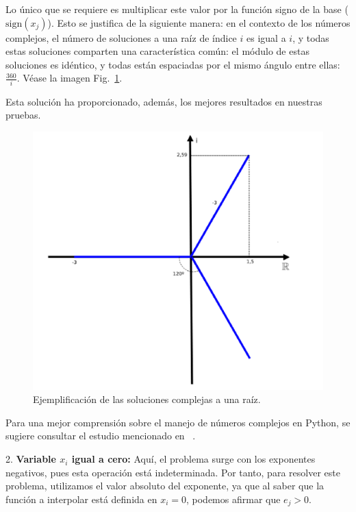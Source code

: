 \documentclass[conference,a4paper]{IEEEtran}
\def\figurename{Fig.}
\begin{document}
Lo único que se requiere es multiplicar este valor por la función signo de la base (\(\text{sign}(x_j)\)). Esto se justifica de la siguiente manera: en el contexto de los números complejos, el número de soluciones a una raíz de índice \(i\) es igual a \(i\), y todas estas soluciones comparten una característica común: el módulo de estas soluciones es idéntico, y todas están espaciadas por el mismo ángulo entre ellas: \(\frac{360}{i}\). Véase la imagen \figurename~\ref{fig:roots_example}.

Esta solución ha proporcionado, además, los mejores resultados en nuestras pruebas.


\begin{figure}[H]
    \centering
    \includegraphics[width=\columnwidth]{image-roots-example.jpg}
    \caption{Ejemplificación de las soluciones complejas a una raíz.}
    \label{fig:roots_example}
\end{figure}

Para una mejor comprensión sobre el manejo de números complejos en Python, se sugiere consultar el estudio mencionado en ~\cite{b3}.

2. \textbf{Variable \( x_i \) igual a cero:} Aquí, el problema surge con los exponentes negativos, pues esta operación está indeterminada. Por tanto, para resolver este problema, utilizamos el valor absoluto del exponente, ya que al saber que la función a interpolar está definida en \( x_i = 0 \), podemos afirmar que \( e_j > 0 \).
\end{document}
